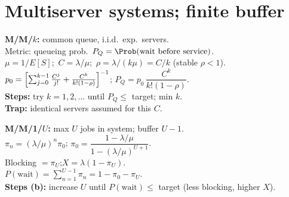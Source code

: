 \section*{Multiserver systems; finite buffer}
\textbf{M/M/$k$:} common queue, i.i.d.\ exp.\ servers.\\
Metric: queueing prob.\ $P_Q=\Prob(\text{wait before service})$.\\
$\mu=1/E[S]$;\ $C=\lambda/\mu$;\ $\rho=\lambda/(k\mu)=C/k$ (stable $\rho<1$).\\
$p_0=\Bigl[\sum_{j=0}^{k-1}\frac{C^j}{j!}+\frac{C^k}{k!(1-\rho)}\Bigr]^{-1}$;\quad
$P_Q=p_0\,\dfrac{C^k}{k!(1-\rho)}$.\\
\textbf{Steps:} try $k=1,2,\ldots$ until $P_Q\le$ target; min $k$.\\
\textbf{Trap:} identical servers assumed for this $C$.

\textbf{M/M/1/$U$:} max $U$ jobs in system; buffer $U-1$.\\
$\pi_n=(\lambda/\mu)^n\pi_0$;\quad
$\pi_0=\dfrac{1-\lambda/\mu}{1-(\lambda/\mu)^{U+1}}$.\\
Blocking $=\pi_U$;\quad $X=\lambda(1-\pi_U)$.\\
$P(\text{wait})=\sum_{n=1}^{U-1}\pi_n=1-\pi_0-\pi_U$.\\
\textbf{Steps (b):} increase $U$ until $P(\text{wait})\le$ target (less blocking, higher $X$).
